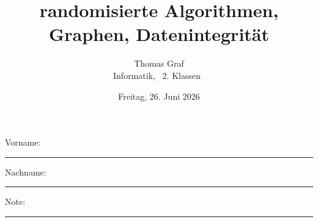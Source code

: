 \newtoggle{withbonus}

\newcommand{\mycourse}{Informatik}

\newcommand{\myclass}{\faPeace\faIceCream~2. Klassen~\faIceCream\faPeace}

\newcommand{\mydate}{Freitag, 26. Juni 2026}

\title{\textbf{randomisierte Algorithmen, Graphen, Datenintegrität}}
\author{Thomas Graf\\
\mycourse, \myclass}
\date{\mydate}
\maketitle
\thispagestyle{headandfoot}

\begin{center}
\end{center}

\vspace{10mm}

\begin{center}
	Vorname: \rule{45mm}{0.8pt}\qquad Nachname: \rule{45mm}{0.8pt}
\end{center}

\vspace{20mm}

\begin{center}
	\iftoggle{withbonus}{
		\combinedgradetable[h][questions]
	}{
		\gradetable[h][questions]
	}
\end{center}

\vspace{15mm}

\begin{center}
	Note:
	\vspace{10mm}

	\rule{8mm}{1.2pt}
\end{center}


